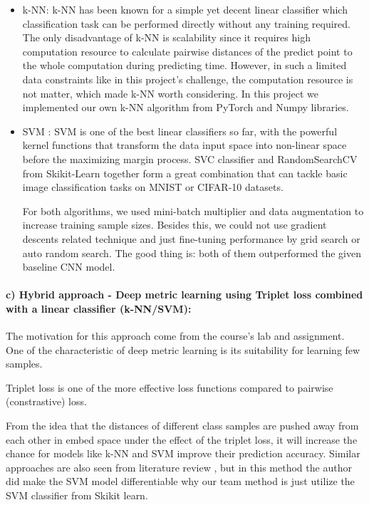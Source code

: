 \documentclass[10pt,twocolumn,letterpaper]{article}
\begin{document}
\begin{itemize}
    \item k-NN: k-NN has been known for a simple yet decent linear classifier which classification task can be performed directly without any training required. The only disadvantage of k-NN is scalability since it requires high computation resource to calculate pairwise distances of the predict point to the whole computation during predicting time. However, in such a limited data constraints like in this project's challenge, the computation resource is not matter, which made k-NN worth considering. In this project we implemented our own k-NN algorithm from PyTorch and Numpy libraries.
    \item SVM \cite{svm}: SVM is one of the best linear classifiers so far, with the powerful kernel functions that transform the data input space into non-linear space before the maximizing margin process. SVC classifier and RandomSearchCV from Skikit-Learn together form a great combination that can tackle basic image classification tasks on MNIST or CIFAR-10 datasets.
    
    For both algorithms, we used mini-batch multiplier and data augmentation to increase training sample sizes. Besides this, we could not use gradient descents related technique and just fine-tuning performance by grid search or auto random search. 
    The good thing is: both of them outperformed the given baseline CNN model. 
    
\end{itemize}

\paragraph{c) Hybrid approach - Deep metric learning using Triplet loss combined with a linear classifier (k-NN/SVM):}

The motivation for this approach come from the course's lab and assignment. One of the characteristic of deep metric learning is its suitability for learning few samples.  

Triplet loss is one of the more effective loss functions compared to pairwise (constrastive) loss.

From the idea that the distances of different class samples are pushed away from each other in embed space under the effect of the triplet loss, it will increase the chance for models like k-NN and SVM improve their prediction accuracy. Similar approaches are also seen from literature review \cite{AGARWAL2018_DAGSVM, tang13_dl_svm}, but in this method the author did make the SVM model differentiable why our team method is just utilize the SVM classifier from Skikit learn. 
\end{document}
